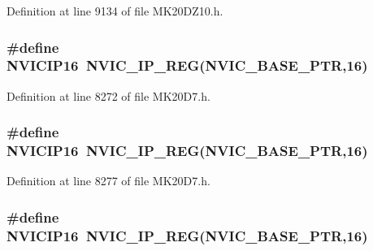 Definition at line 9134 of file M\+K20\+D\+Z10.\+h.

\subsubsection[{\texorpdfstring{N\+V\+I\+C\+I\+P16}{NVICIP16}}]{\setlength{\rightskip}{0pt plus 5cm}\#define N\+V\+I\+C\+I\+P16~{\bf N\+V\+I\+C\+\_\+\+I\+P\+\_\+\+R\+EG}({\bf N\+V\+I\+C\+\_\+\+B\+A\+S\+E\+\_\+\+P\+TR},16)}\hypertarget{group___n_v_i_c___register___accessor___macros_ga67ec9cf7d363921b19f453985a0378ef}{}\label{group___n_v_i_c___register___accessor___macros_ga67ec9cf7d363921b19f453985a0378ef}


Definition at line 8272 of file M\+K20\+D7.\+h.

\subsubsection[{\texorpdfstring{N\+V\+I\+C\+I\+P16}{NVICIP16}}]{\setlength{\rightskip}{0pt plus 5cm}\#define N\+V\+I\+C\+I\+P16~{\bf N\+V\+I\+C\+\_\+\+I\+P\+\_\+\+R\+EG}({\bf N\+V\+I\+C\+\_\+\+B\+A\+S\+E\+\_\+\+P\+TR},16)}\hypertarget{group___n_v_i_c___register___accessor___macros_ga67ec9cf7d363921b19f453985a0378ef}{}\label{group___n_v_i_c___register___accessor___macros_ga67ec9cf7d363921b19f453985a0378ef}


Definition at line 8277 of file M\+K20\+D7.\+h.

\subsubsection[{\texorpdfstring{N\+V\+I\+C\+I\+P16}{NVICIP16}}]{\setlength{\rightskip}{0pt plus 5cm}\#define N\+V\+I\+C\+I\+P16~{\bf N\+V\+I\+C\+\_\+\+I\+P\+\_\+\+R\+EG}({\bf N\+V\+I\+C\+\_\+\+B\+A\+S\+E\+\_\+\+P\+TR},16)}\hypertarget{group___n_v_i_c___register___accessor___macros_ga67ec9cf7d363921b19f453985a0378ef}{}\label{group___n_v_i_c___register___accessor___macros_ga67ec9cf7d363921b19f453985a0378ef}


